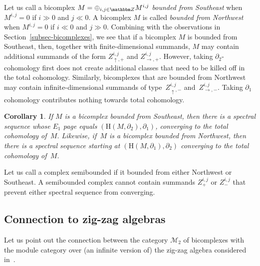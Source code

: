 \documentclass[10pt,a4paper]{amsart}
\newtheorem{cor}[thm]{Corollary}
\theoremstyle{definition}
\numberwithin{equation}{section}
\def\Z{{\mathbbm Z}}
\def\dif{\partial}
\def\mc{\mathcal}
\newcommand{\mH}{\mathrm{H}} %
\begin{document}
Let us call a bicomplex $M=\oplus_{i,j\in \Z}M^{i,j}$ \emph{bounded from Southeast} when $M^{i,j}=0$ if $i\gg 0$ and $j \ll 0$. A bicomplex $M$ is called \emph{bounded from Northwest} when $M^{i,j}=0$ if $i \ll 0 $ and $j \gg 0$. Combining with the observations in Section~\ref{subsec-bicomplexes}, we see that if a bicomplex $M$ is bounded from Southeast, then, together with finite-dimensional summands, $M$ may contain additional summands of the form $Z^{i,j}_{\uparrow,+}$ and $Z^{i,j}_{\rightarrow,+}$. However, taking $\dif_2$-cohomology first does not create additional classes that need to be killed off in the total cohomology. Similarly, bicomplexes that are bounded from Northwest may contain infinite-dimensional summands of type~$Z^{i,j}_{\uparrow, -}$ and~$Z^{i,j}_{\rightarrow, -}$. Taking $\dif_1$ cohomology contributes nothing towards total cohomology.

\begin{cor}If $M$ is a bicomplex bounded from Southeast, then there is a spectral sequence whose $E_1$ page equals $(\mH(M,\dif_2),\dif_1)$, converging to the total cohomology of~$M$. Likewise, if~$M$ is a bicomplex bounded from Northwest, then there is a spectral sequence starting at $(\mH(M,\dif_1),\dif_2)$ converging to the total cohomology of~$M$.
\end{cor}

Let us call a complex semibounded if it bounded from either Northwest or Southeast. A semibounded complex cannot contain summands $Z^{i,j}_{+}$ or $Z^{i,j}_{-}$ that prevent either spectral sequence from converging.

\subsection{Connection to zig-zag algebras}\label{subsec-Lambda-2-zig-zag}
Let us point out the connection between the category $\mc{M}_2$ of bicomplexes with the module category over (an infinite version of) the zig-zag algebra considered in~\cite{KhSe}.
\end{document}
